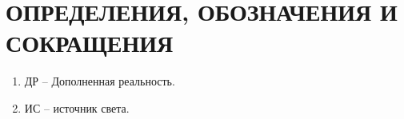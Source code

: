\chapter*{ОПРЕДЕЛЕНИЯ, ОБОЗНАЧЕНИЯ И СОКРАЩЕНИЯ}

\begin{enumerate}
	\item ДР -- Дополненная реальность. 
	\item ИС -- источник света.
\end{enumerate}